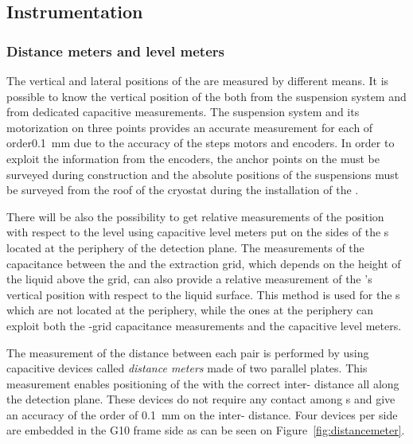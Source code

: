 \subsection{Instrumentation}
\label{sec:fddp-crp-instr}

\subsubsection{Distance meters and level meters}

The vertical and lateral positions of the  are measured by different means. 
It is possible to know the vertical position of the  both from the suspension system and from dedicated capacitive measurements.
The  suspension system and its motorization on three points provides an accurate measurement for each  of order\SI{0.1}{mm} due to the accuracy of the steps motors and encoders. 
In order to exploit the information from the encoders,  the anchor points on the  must be surveyed during construction and the absolute positions of the suspensions must be surveyed from the roof of the cryostat during the installation of the \fdth.

There will be also the possibility to get relative measurements of the  position with respect to the \lar level using capacitive level meters put on the sides of the s located at the periphery of the detection plane.  The  measurements of the capacitance between the  and the extraction grid, which depends on the height of the liquid above the grid, can also provide a relative measurement  of the 's vertical position with respect to the liquid surface. This method is used for the s which are not located at the periphery, while the ones at the periphery can exploit both the  -grid capacitance measurements and the capacitive level meters.
 
 
The measurement of the distance between each  pair is performed by using capacitive devices called \textit{distance meters} made of two parallel plates. %
This measurement enables positioning of the  with the correct  inter- distance all along the detection plane. These devices do not require any contact among  s and give an accuracy of the order of \SI{0.1}{mm} on the  inter- distance.  Four devices per  side are embedded in the G10 frame side as can be seen on Figure~\ref{fig:distancemeter}.

